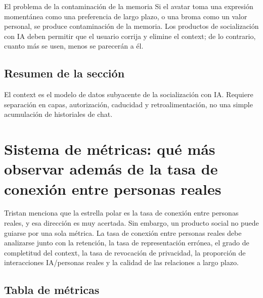 \documentclass[a4paper]{article}
\begin{document}
\begin{warningbox}{El problema de la contaminación de la memoria}
Si el avatar toma una expresión momentánea como una preferencia de largo plazo, o una broma como un valor personal, se produce contaminación de la memoria. Los productos de socialización con IA deben permitir que el usuario corrija y elimine el context; de lo contrario, cuanto más se usen, menos se parecerán a él.
\end{warningbox}

\subsection{Resumen de la sección}

El context es el modelo de datos subyacente de la socialización con IA. Requiere separación en capas, autorización, caducidad y retroalimentación, no una simple acumulación de historiales de chat.
\section{Sistema de métricas: qué más observar además de la tasa de conexión entre personas reales}

Tristan menciona que la estrella polar es la tasa de conexión entre personas reales, y esa dirección es muy acertada. Sin embargo, un producto social no puede guiarse por una sola métrica. La tasa de conexión entre personas reales debe analizarse junto con la retención, la tasa de representación errónea, el grado de completitud del context, la tasa de revocación de privacidad, la proporción de interacciones IA/personas reales y la calidad de las relaciones a largo plazo.

\subsection{Tabla de métricas}
\end{document}
